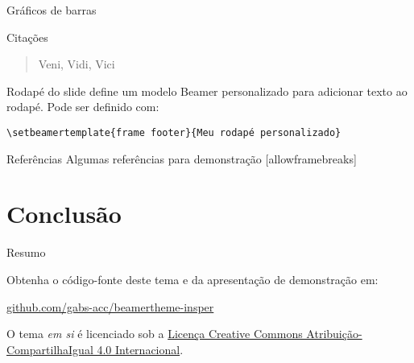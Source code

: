 \begin{frame}{Gráficos de barras}
  \begin{figure}
  \end{figure}
\end{frame}

\begin{frame}{Citações}
  \begin{quote}
    Veni, Vidi, Vici
  \end{quote}
\end{frame}

{%
\begin{frame}[fragile]{Rodapé do slide}
    \themename define um modelo Beamer personalizado para adicionar texto ao rodapé. Pode ser definido com:
    \begin{verbatim}\setbeamertemplate{frame footer}{Meu rodapé personalizado}\end{verbatim}
\end{frame}
}

\begin{frame}{Referências}
  Algumas referências para demonstração [allowframebreaks] \cite{knuth92,ConcreteMath,Simpson,Er01,greenwade93}
\end{frame}

\section{Conclusão}

\begin{frame}{Resumo}

  Obtenha o código-fonte deste tema e da apresentação de demonstração em:

  \begin{center}\url{github.com/gabs-acc/beamertheme-insper}\end{center}

  O tema \emph{em si} é licenciado sob a
  \href{http://creativecommons.org/licenses/by-sa/4.0/}{Licença Creative Commons
  Atribuição-CompartilhaIgual 4.0 Internacional}.

  \begin{center}\ccbysa\end{center}

\end{frame}

